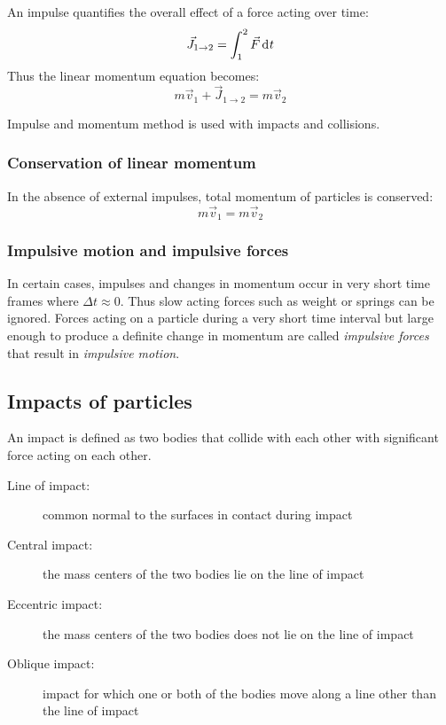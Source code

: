 \documentclass[10pt, twocolumn]{article}
\begin{document}
An impulse quantifies the overall effect of a force acting over time:
\[
  \vec{J}_{1 \to 2} = \int_1^2{\vec{F} \,\mathrm{d}^{} t}
\]
Thus the linear momentum equation becomes:
\[
  m\vec{v}_1 + \vec{J}_{1 \to 2} = m\vec{v}_2
\]

Impulse and momentum method is used with impacts and collisions.


\subsubsection{Conservation of linear momentum}
In the absence of external impulses, total momentum of particles is conserved:
\[
  m\vec{v}_1 = m\vec{v}_2
\]


\subsubsection{Impulsive motion and impulsive forces}
In certain cases, impulses and changes in momentum occur in very short time frames where \(\Delta t \approx 0\).
Thus slow acting forces such as weight or springs can be ignored.
Forces acting on a particle during a very short time interval but large enough to produce a definite change in momentum are called \emph{impulsive forces} that result in \emph{impulsive motion}.



\subsection{Impacts of particles}
An impact is defined as two bodies that collide with each other with significant force acting on each other.

\begin{description}
  \item[Line of impact:] common normal to the surfaces in contact during impact
  \item[Central impact:] the mass centers of the two bodies lie on the line of impact
  \item[Eccentric impact:] the mass centers of the two bodies does not lie on the line of impact
  \item[Oblique impact:] impact for which one or both of the bodies move along a line other than the line of impact
\end{description}
\end{document}
